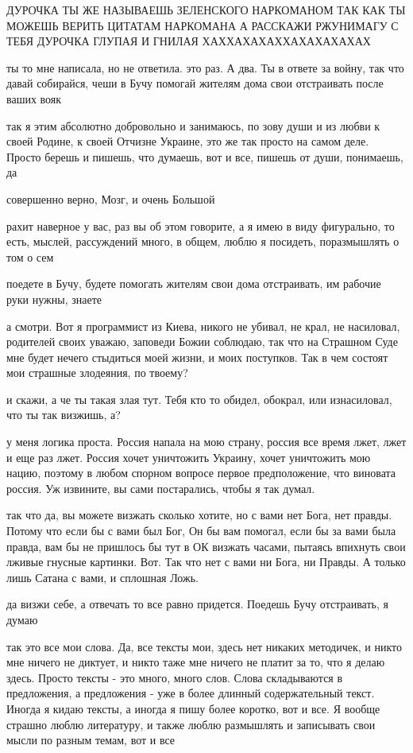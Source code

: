 ДУРОЧКА ТЫ ЖЕ НАЗЫВАЕШЬ ЗЕЛЕНСКОГО НАРКОМАНОМ ТАК КАК ТЫ МОЖЕШЬ ВЕРИТЬ ЦИТАТАМ
НАРКОМАНА А РАССКАЖИ РЖУНИМАГУ С ТЕБЯ ДУРОЧКА ГЛУПАЯ И ГНИЛАЯ
ХАХХАХАХАХХАХАХАХАХАХ


ты то мне написала, но не ответила. это раз. А два. Ты в ответе за войну, так
что давай собирайся, чеши в Бучу помогай жителям дома свои отстраивать после
ваших вояк

так я этим абсолютно добровольно и занимаюсь, по зову души и из любви к своей
Родине, к своей Отчизне Украине, это же так просто на самом деле. Просто берешь
и пишешь, что думаешь, вот и все, пишешь от души, понимаешь, да

совершенно верно, Мозг, и очень Большой

рахит наверное у вас, раз вы об этом говорите, а я имею в виду фигурально, то
есть, мыслей, рассуждений много, в общем, люблю я посидеть, поразмышлять о том
о сем

поедете в Бучу, будете помогать жителям свои дома отстраивать, им рабочие руки
нужны, знаете


а смотри. Вот я программист из Киева, никого не убивал, не крал, не насиловал,
родителей своих уважаю, заповеди Божии соблюдаю, так что на Страшном Суде мне
будет нечего стыдиться моей жизни, и моих поступков. Так в чем состоят мои
страшные злодеяния, по твоему?

и скажи, а че ты такая злая тут. Тебя кто то обидел, обокрал, или изнасиловал,
что ты так визжишь, а?

у меня логика проста. Россия напала на мою страну, россия все время лжет, лжет
и еще раз лжет. Россия хочет уничтожить Украину, хочет уничтожить мою нацию,
поэтому в любом спорном вопросе первое предположение, что виновата россия. Уж
извините, вы сами постарались, чтобы я так думал.

так что да, вы можете визжать сколько хотите, но с вами нет Бога, нет правды.
Потому что если бы с вами был Бог, Он бы вам помогал, если бы за вами была
правда, вам бы не пришлось бы тут в ОК визжать часами, пытаясь впихнуть свои
лживые гнусные картинки. Вот. Так что нет с вами ни Бога, ни Правды. А только
лишь Сатана с вами, и сплошная Ложь.

да визжи себе, а отвечать то все равно придется. Поедешь Бучу отстраивать, я
думаю

так это все мои слова. Да, все тексты мои, здесь нет никаких методичек, и никто
мне ничего не диктует, и никто таже мне ничего не платит за то, что я делаю
здесь. Просто тексты - это много, много слов. Слова складываются в предложения,
а предложения - уже в более длинный содержательный текст. Иногда я кидаю
тексты, а иногда я пишу более коротко, вот и все. Я вообще страшно люблю
литературу, и также люблю размышлять и записывать свои мысли по разным темам,
вот и все

